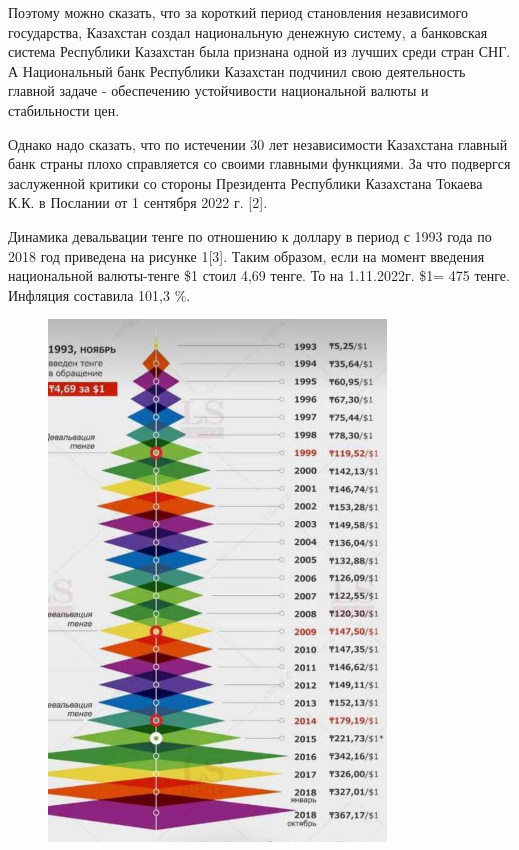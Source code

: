 Поэтому можно сказать, что за короткий период становления независимого
государства, Казахстан создал национальную денежную систему, а
банковская система Республики Казахстан была признана одной из лучших
среди стран СНГ. А Национальный банк Республики Казахстан подчинил свою
деятельность главной задаче - обеспечению устойчивости национальной
валюты и стабильности цен.

Однако надо сказать, что по истечении 30 лет независимости Казахстана
главный банк страны плохо справляется со своими главными функциями. За
что подвергся заслуженной критики со стороны Президента Республики
Казахстана Токаева К.К. в Послании от 1 сентября 2022 г. {[}2{]}.

Динамика девальвации тенге по отношению к доллару в период с 1993 года
по 2018 год приведена на рисунке 1{[}3{]}. Таким образом, если на момент
введения национальной валюты-тенге \$1 стоил 4,69 тенге. То на
1.11.2022г. \$1= 475 тенге. Инфляция составила 101,3 \%.

\begin{figure}[H]
	\centering
	\includegraphics[width=0.8\textwidth]{assets/1117}
	\caption*{}
\end{figure}

